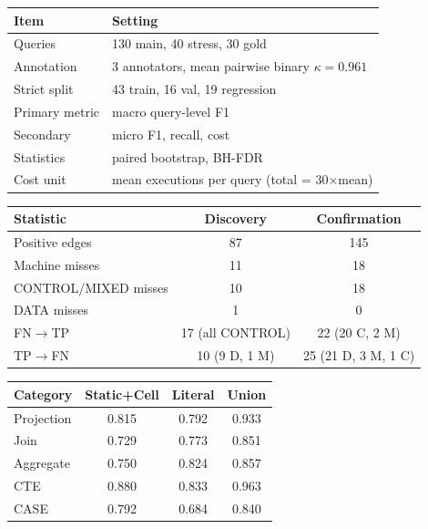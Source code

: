 \documentclass[sigconf, nonacm]{acmart}
\begin{document}
\begin{center}
\label{tab:settings}
\small
\begin{tabular}{ll}
\toprule
Item & Setting \\
\midrule
Queries & 130 main, 40 stress, 30 gold \\
Annotation & 3 annotators, mean pairwise binary $\kappa=0.961$ \\
Strict split & 43 train, 16 val, 19 regression \\
Primary metric & macro query-level F1 \\
Secondary & micro F1, recall, cost \\
Statistics & paired bootstrap, BH-FDR \\
Cost unit & mean executions per query (total = 30$\times$mean) \\
\bottomrule
\end{tabular}
\end{center}

\begin{center}
\scriptsize
\setlength{\tabcolsep}{2pt}
\label{tab:replication}
\begin{tabular}{lcc}
\toprule
Statistic & Discovery & Confirmation \\
\midrule
Positive edges & 87 & 145 \\
Machine misses & 11 & 18 \\
CONTROL/MIXED misses & 10 & 18 \\
DATA misses & 1 & 0 \\
FN$\to$TP & 17 (all CONTROL) & 22 (20 C, 2 M) \\
TP$\to$FN & 10 (9 D, 1 M) & 25 (21 D, 3 M, 1 C) \\
\bottomrule
\end{tabular}
\end{center}

\begin{center}
\label{tab:conf-category}
\begin{tabular}{lccc}
\toprule
Category & Static+Cell & Literal & Union \\
\midrule
Projection & 0.815 & 0.792 & 0.933 \\
Join & 0.729 & 0.773 & 0.851 \\
Aggregate & 0.750 & 0.824 & 0.857 \\
CTE & 0.880 & 0.833 & 0.963 \\
CASE & 0.792 & 0.684 & 0.840 \\
\bottomrule
\end{tabular}
\end{center}
\end{document}
